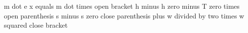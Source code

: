 m dot e x equals m dot times open bracket h minus h zero minus T zero times open parenthesis s minus s zero close parenthesis plus w divided by two times w squared close bracket